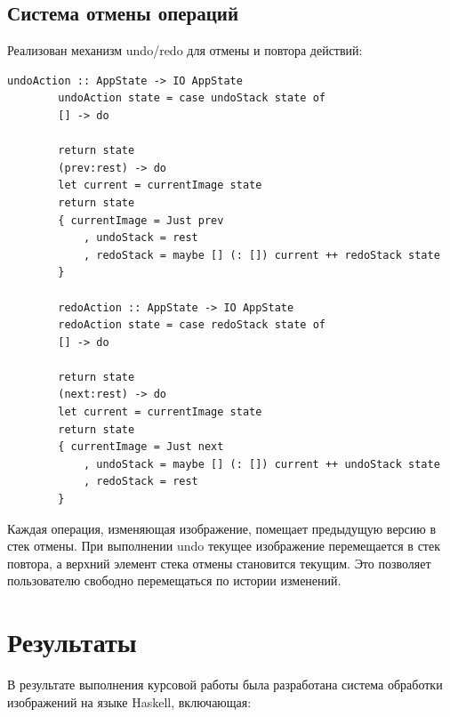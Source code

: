 \documentclass[a4paper,12pt]{article}
\begin{document}
	\subsection{Система отмены операций}
	
	Реализован механизм undo/redo для отмены и повтора действий:
	
	\begin{lstlisting}[caption=Механизм undo/redo, label=lst:undo-redo]
		undoAction :: AppState -> IO AppState
		undoAction state = case undoStack state of
		[] -> do

		return state
		(prev:rest) -> do
		let current = currentImage state
		return state
		{ currentImage = Just prev
			, undoStack = rest
			, redoStack = maybe [] (: []) current ++ redoStack state
		}
		
		redoAction :: AppState -> IO AppState
		redoAction state = case redoStack state of
		[] -> do

		return state
		(next:rest) -> do
		let current = currentImage state
		return state
		{ currentImage = Just next
			, undoStack = maybe [] (: []) current ++ undoStack state
			, redoStack = rest
		}
	\end{lstlisting}
	
	Каждая операция, изменяющая изображение, помещает предыдущую версию в стек отмены. При выполнении undo текущее изображение перемещается в стек повтора, а верхний элемент стека отмены становится текущим. Это позволяет пользователю свободно перемещаться по истории изменений.
	
	
	\newpage
	\section{Результаты }
	В результате выполнения курсовой работы была разработана система обработки изображений на языке Haskell, включающая:
	
\end{document}
